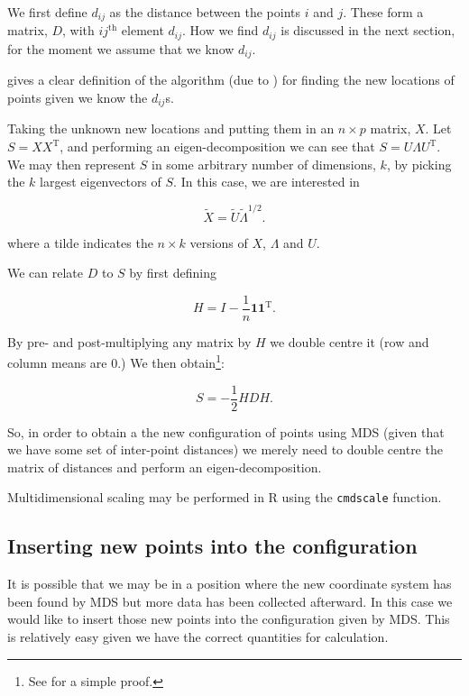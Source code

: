 \documentclass[a4paper,10pt]{amsart}
\newcommand{\tr}[1]{#1^{\text{T}}}
\begin{document}
We first define $d_{ij}$ as the distance between the points $i$ and $j$. These form a matrix, $D$, with $ij^{\text{th}}$ element $d_{ij}$. How we find $d_{ij}$ is discussed in the next section, for the moment we assume that we know $d_{ij}$.

\cite{diaconis08} gives a clear definition of the algorithm (due to \cite{schoenberg35}) for finding the new locations of points given we know the $d_{ij}$s. 

Taking the unknown new locations and putting them in an $n \times p$ matrix, $X$. Let $S=X\tr{X}$, and performing an eigen-decomposition we can see that $S=U\Lambda\tr{U}$. We may then represent $S$ in some arbitrary number of dimensions, $k$, by picking the $k$ largest eigenvectors of $S$. In this case, we are interested in

\begin{equation}
\tilde{X}=\tilde{U}\tilde{\Lambda}^{1/2}.
\end{equation}

where a tilde indicates the $n \times k$ versions of $X$, $\Lambda$ and $U$.

We can relate $D$ to $S$ by first defining

\begin{equation}
H = I-\frac{1}{n}\mathbf{1}\tr{\mathbf{1}}.
\end{equation}

By pre- and post-multiplying any matrix by $H$ we double centre it (row and column means are 0.) We then obtain\footnote{See \cite{diaconis08} for a simple proof.}:

\begin{equation}
S = -\frac{1}{2}HDH.
\end{equation}

So, in order to obtain a the new configuration of points using MDS (given that we have some set of inter-point distances) we merely need to double centre the matrix of distances and perform an eigen-decomposition.

Multidimensional scaling may be performed in \textsf{R} using the \texttt{cmdscale} function. 

\subsection{Inserting new points into the configuration}

It is possible that we may be in a position where the new coordinate system has been found by MDS but more data has been collected afterward. In this case we would like to insert those new points into the configuration given by MDS. This is relatively easy given we have the correct quantities for calculation.
\end{document}
